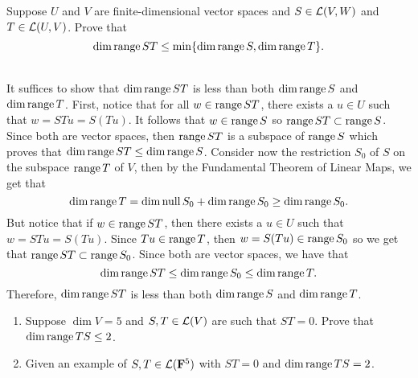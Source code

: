 \begin{exercise}
    Suppose $U$ and $V$ are finite-dimensional vector spaces and $S \in \mathcal{L}(V,W)$ and $T \in \mathcal{L}(U,V)$. Prove that
    $$\dim \operatorname{\text{range}} ST \leq \min\{\dim \operatorname{\text{range}} S, \dim \operatorname{\text{range}} T\}.$$
\end{exercise}

\begin{solution}
    \\ It suffices to show that $\dim \operatorname{\text{range}} ST$ is less than both $\dim \operatorname{\text{range}} S$ and $\dim \operatorname{\text{range}} T$. First, notice that for all $w \in \operatorname{\text{range}} ST$, there exists a $u \in U$ such that $w = STu = S(Tu)$. It follows that $w \in \operatorname{\text{range}} S$ so $\operatorname{\text{range}} ST \subset \operatorname{\text{range}} S$. Since both are vector spaces, then $\operatorname{\text{range}} ST$ is a subspace of $\operatorname{\text{range}} S$ which proves that $\dim \operatorname{\text{range}} ST \leq \dim \operatorname{\text{range}} S$. Consider now the restriction $S_0$ of $S$ on the subspace $\operatorname{\text{range}} T$ of $V$, then by the Fundamental Theorem of Linear Maps, we get that
    $$\dim \operatorname{\text{range}} T = \dim \operatorname{\text{null}} S_0 + \dim \operatorname{\text{range}} S_0 \geq \dim \operatorname{\text{range}} S_0.$$
    But notice that if $w \in \operatorname{\text{range}} ST$, then there exists a $u \in U$ such that $w = STu = S(Tu)$. Since $Tu \in \operatorname{\text{range}} T$, then $w = S(Tu) \in \operatorname{\text{range}} S_0$ so we get that $\operatorname{\text{range}} ST \subset \operatorname{\text{range}} S_0$. Since both are vector spaces, we have that
    $$\dim \operatorname{\text{range}} ST \leq \dim \operatorname{\text{range}} S_0 \leq \dim \operatorname{\text{range}} T.$$
    Therefore, $\dim \operatorname{\text{range}} ST$ is less than both $\dim \operatorname{\text{range}} S$ and $\dim \operatorname{\text{range}} T$. \\
\end{solution}

\begin{exercise}
    \vspace{-5.5mm}
    \begin{enumerate}[label=(\alph*)]
        \item Suppose $\dim V = 5$ and $S,T \in \mathcal{L}(V)$ are such that $ST = 0$. Prove that $\dim \operatorname{\text{range}} TS \leq 2$.
        \item Given an example of $S,T \in \mathcal{L}(\mathbf{F}^5)$ with $ST = 0$ and $\dim \operatorname{\text{range}} TS = 2$. \\
    \end{enumerate}
\end{exercise}

